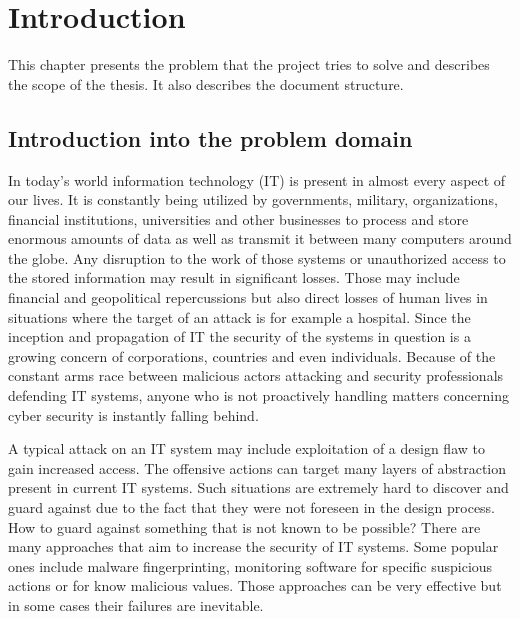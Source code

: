 \documentclass[a4paper,twoside,12pt]{book}
\newcounter{PagesWithoutNumbers}
\begin{document}
\vfill
 
 

\cleardoublepage


\pagestyle{onlyPageNumbers}
\tableofcontents

\setcounter{PagesWithoutNumbers}{\value{page}}
\mainmatter
\pagestyle{PageNumbersChapterTitles}


\chapter{Introduction}

This chapter presents the problem that the project tries to solve and describes the scope 
of the thesis. It also describes the document structure.



\section{Introduction into the problem domain}


In today's world information technology (IT) is present in almost every aspect of our lives. 
It is constantly being utilized by governments, military, organizations, financial institutions,
universities and other businesses to process and store enormous amounts of data as well as 
transmit it between many computers around the globe. Any disruption to the work of those 
systems or unauthorized access to the stored information may result in significant losses.
Those may include financial and geopolitical repercussions but also direct losses of human
lives in situations where the target of an attack is for example a hospital. Since the inception
and propagation of IT the security of the systems in question is a growing concern of corporations, 
countries and even individuals. Because of the constant arms race between malicious actors attacking 
and security professionals defending IT systems, anyone who is not proactively handling matters concerning cyber security 
is instantly falling behind. \cite{bib:articleImportanceOfCybersecurity} 

A typical attack on an IT system may include exploitation of a design 
flaw to gain increased access. The offensive actions can target many layers of 
abstraction present in current IT systems. Such situations are extremely hard to discover 
and guard against due to the fact that they were not foreseen in the design process. How to guard 
against something that is not known to be possible? There are many approaches that aim to 
increase the security of IT systems. Some popular ones include malware fingerprinting, 
monitoring software for specific suspicious actions or for know 
malicious values. Those approaches can be very effective but in some cases their 
failures are inevitable.
\end{document}
